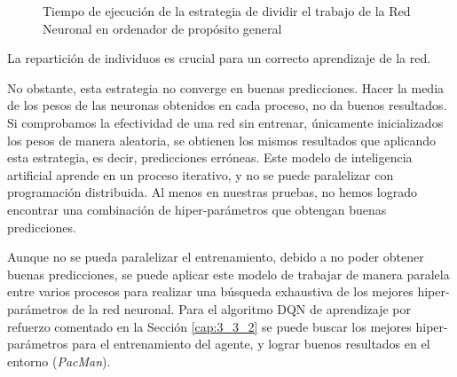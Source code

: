 \begin{figure}[!h]
	\centering
	\caption{Tiempo de ejecución de la estrategia de dividir el trabajo de la Red Neuronal en ordenador de propósito general}
	\label{fig:redneu_estrategia2}
\end{figure}




La repartición de individuos es crucial para un correcto aprendizaje de la red. 

No obstante, esta estrategia no converge en buenas predicciones. Hacer la media de los pesos de las neuronas obtenidos en cada proceso, no da buenos resultados. Si comprobamos la efectividad de una red sin entrenar, únicamente inicializados los pesos de manera aleatoria, se obtienen los mismos resultados que aplicando esta estrategia, es decir, predicciones erróneas. Este modelo de inteligencia artificial aprende en un proceso iterativo, y no se puede paralelizar con programación distribuida. Al menos en nuestras pruebas, no hemos logrado encontrar una combinación de hiper-parámetros que obtengan buenas predicciones.



Aunque no se pueda paralelizar el entrenamiento, debido a no poder obtener buenas predicciones, se puede aplicar este modelo de trabajar de manera paralela entre varios procesos para realizar una búsqueda exhaustiva de los mejores hiper-parámetros de la red neuronal. Para el algoritmo DQN de aprendizaje por refuerzo comentado en la Sección \ref{cap:3_3_2} se puede buscar los mejores hiper-parámetros para el entrenamiento del agente, y lograr buenos resultados en el entorno (\textit{PacMan}). 

